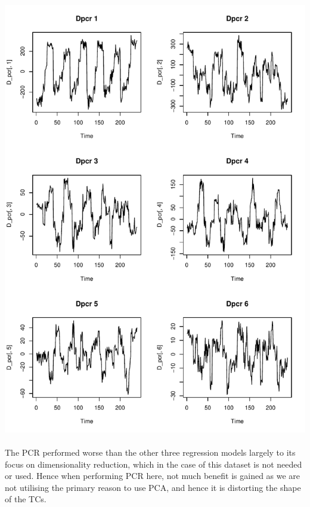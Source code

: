 \documentclass[11pt]{article}
\begin{document}
\includegraphics[width=.55\linewidth]{plots/Dpcr_subplots.pdf}\\\\
The PCR performed worse than the other three regression models largely to its focus on dimensionality reduction, which in the case of this dataset is not needed or used. Hence when performing PCR here, not much benefit is gained as we are not utilising the primary reason to use PCA, and hence it is distorting the shape of the TCs.
\end{document}
